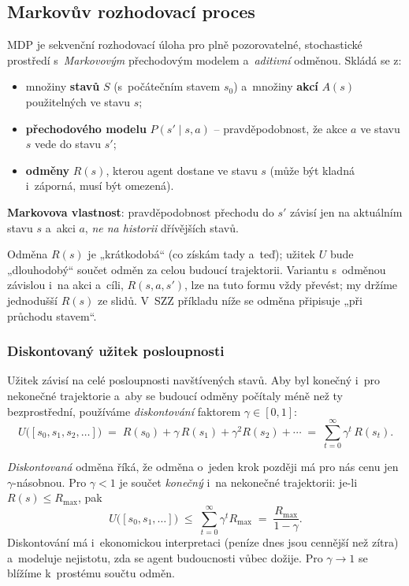 \subsection{Markovův rozhodovací proces}

\begin{definice}
MDP je sekvenční rozhodovací úloha pro plně pozorovatelné, stochastické prostředí s~\emph{Markovovým} přechodovým modelem a~\emph{aditivní} odměnou. Skládá se z:
\begin{itemize}
  \item množiny \textbf{stavů} $S$ (s~počátečním stavem $s_0$) a~množiny \textbf{akcí} $A(s)$ použitelných ve stavu $s$;
  \item \textbf{přechodového modelu} $P(s'\mid s,a)$ -- pravděpodobnost, že akce $a$ ve stavu $s$ vede do stavu $s'$;
  \item \textbf{odměny} $R(s)$, kterou agent dostane ve stavu $s$ (může být kladná i~záporná, musí být omezená).
\end{itemize}
\textbf{Markovova vlastnost}: pravděpodobnost přechodu do $s'$ závisí jen na aktuálním stavu $s$ a~akci $a$, \emph{ne na historii} dřívějších stavů.
\end{definice}

\begin{poznamka}
Odměna $R(s)$ je „krátkodobá`` (co získám tady a~teď); užitek $U$ bude „dlouhodobý`` součet odměn za celou budoucí trajektorii. Variantu s~odměnou závislou i~na akci a~cíli, $R(s,a,s')$, lze na tuto formu vždy převést; my držíme jednodušší $R(s)$ ze slidů. V~SZZ příkladu níže se odměna připisuje „při průchodu stavem``.
\end{poznamka}

\subsubsection*{Diskontovaný užitek posloupnosti}

Užitek závisí na celé posloupnosti navštívených stavů. Aby byl konečný i~pro nekonečné trajektorie a~aby se budoucí odměny počítaly méně než ty bezprostřední, používáme \emph{diskontování} faktorem $\gamma\in[0,1]$:
\[
  U\big([s_0,s_1,s_2,\dots]\big) \;=\; R(s_0) + \gamma\,R(s_1) + \gamma^2 R(s_2) + \cdots \;=\; \sum_{t=0}^{\infty} \gamma^{t}\, R(s_t).
\]

\begin{intuice}
\emph{Diskontovaná} odměna říká, že odměna o~jeden krok později má pro nás cenu jen $\gamma$-násobnou. Pro $\gamma<1$ je součet \emph{konečný} i~na nekonečné trajektorii: je-li $R(s)\le R_{\max}$, pak
\[
  U\big([s_0,s_1,\dots]\big) \;\le\; \sum_{t=0}^\infty \gamma^t R_{\max} \;=\; \frac{R_{\max}}{1-\gamma}.
\]
Diskontování má i~ekonomickou interpretaci (peníze dnes jsou cennější než zítra) a~modeluje nejistotu, zda se agent budoucnosti vůbec dožije. Pro $\gamma\to 1$ se blížíme k~prostému součtu odměn.
\end{intuice}

